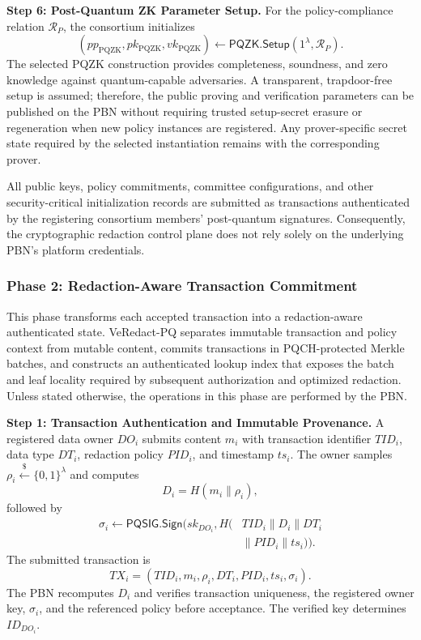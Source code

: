 \documentclass[lettersize,journal]{IEEEtran}
\begin{document}
\textbf{Step 6: Post-Quantum ZK Parameter Setup.}
For the policy-compliance relation $\mathcal{R}_P$, the consortium
initializes
\begin{equation}
(pp_{\mathrm{PQZK}},pk_{\mathrm{PQZK}},vk_{\mathrm{PQZK}})
\leftarrow
\mathsf{PQZK.Setup}(1^\lambda,\mathcal{R}_P).
\end{equation}
The selected PQZK construction provides completeness, soundness, and
zero knowledge against quantum-capable adversaries. A transparent,
trapdoor-free setup is assumed; therefore, the public proving and
verification parameters can be published on the PBN without requiring
trusted setup-secret erasure or regeneration when new policy instances
are registered. Any prover-specific secret state required by the
selected instantiation remains with the corresponding prover.

All public keys, policy commitments, committee configurations, and
other security-critical initialization records are submitted as
transactions authenticated by the registering consortium members'
post-quantum signatures. Consequently, the cryptographic redaction
control plane does not rely solely on the underlying PBN's platform
credentials.
    
    
    
   \subsubsection*{\textbf{Phase 2: Redaction-Aware Transaction Commitment}}

This phase transforms each accepted transaction into a redaction-aware
authenticated state. VeRedact-PQ separates immutable transaction and
policy context from mutable content, commits transactions in
PQCH-protected Merkle batches, and constructs an authenticated lookup
index that exposes the batch and leaf locality required by subsequent
authorization and optimized redaction. Unless stated otherwise, the
operations in this phase are performed by the PBN.

\medskip
\noindent\textbf{Step 1: Transaction Authentication and Immutable
Provenance.}
A registered data owner $DO_i$ submits content $m_i$ with transaction
identifier $TID_i$, data type $DT_i$, redaction policy $PID_i$, and
timestamp $ts_i$. The owner samples
$\rho_i\stackrel{\$}{\leftarrow}\{0,1\}^{\lambda}$ and computes
\begin{equation}
D_i=H(m_i\parallel\rho_i),
\end{equation}
followed by
\begin{equation}
\begin{aligned}
\sigma_i\leftarrow
\mathsf{PQSIG.Sign}\big(
sk_{DO_i},
H(&TID_i\parallel D_i\parallel DT_i\\
&\parallel PID_i\parallel ts_i)\big).
\end{aligned}
\end{equation}
The submitted transaction is
\begin{equation}
TX_i=(TID_i,m_i,\rho_i,DT_i,PID_i,ts_i,\sigma_i).
\end{equation}
The PBN recomputes $D_i$ and verifies transaction uniqueness, the
registered owner key, $\sigma_i$, and the referenced policy before
acceptance. The verified key determines $ID_{DO_i}$.
\end{document}
